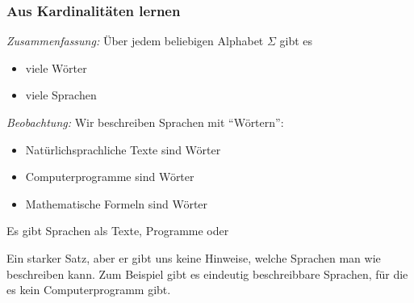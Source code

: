 \documentclass[onlymath]{beamer}
\begin{document}
\begin{frame}\frametitle{Aus Kardinalitäten lernen}

\emph{Zusammenfassung:} Über jedem beliebigen Alphabet $\Sigma$ gibt es
\begin{itemize}
\item {} viele Wörter
\item {} viele Sprachen
\end{itemize}
\bigskip\pause

\emph{Beobachtung:} Wir beschreiben Sprachen mit "`Wörtern"':
\begin{itemize}
\item Natürlichsprachliche Texte sind Wörter
\item Computerprogramme sind Wörter
\item Mathematische Formeln sind Wörter
\end{itemize}
Es gibt  Sprachen als Texte, Programme oder 
\pause
\bigskip


Ein starker Satz, aber er gibt uns keine Hinweise, welche Sprachen man wie beschreiben kann.
Zum Beispiel gibt es eindeutig beschreibbare Sprachen, für die es kein Computerprogramm gibt.

\end{frame}



\end{document}

